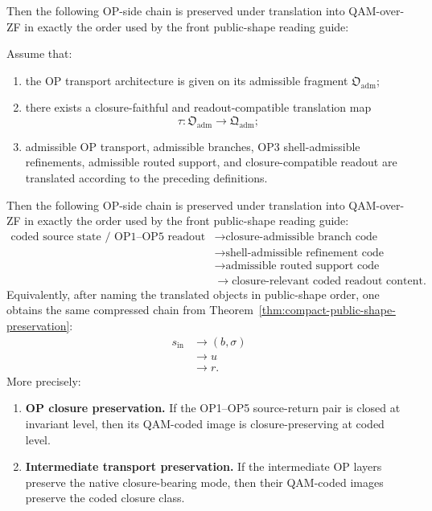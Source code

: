 Then the following OP-side chain is preserved under translation into QAM-over-ZF in exactly the order used by the front public-shape reading guide:
\begin{theorem}\label{thm:qam-translation}
Assume that:
\begin{enumerate}
\item the OP transport architecture is given on its admissible fragment $\mathfrak{O}_{\mathrm{adm}}$;
\item there exists a closure-faithful and readout-compatible translation map
\[
\tau:\mathfrak{O}_{\mathrm{adm}}\to \mathfrak{Q}_{\mathrm{adm}};
\]
\item admissible OP transport, admissible branches, OP3 shell-admissible refinements, admissible routed support, and closure-compatible readout are translated according to the preceding definitions.
\end{enumerate}
Then the following OP-side chain is preserved under translation into QAM-over-ZF in exactly the order used by the front public-shape reading guide:
\[
\begin{aligned}
\text{coded source state / OP1--OP5 readout face}
&\longrightarrow \text{closure-admissible branch code}\\
&\longrightarrow \text{shell-admissible refinement code}\\
&\longrightarrow \text{admissible routed support code}\\
&\longrightarrow \text{closure-relevant coded readout content}.
\end{aligned}
\]
Equivalently, after naming the translated objects in public-shape order, one obtains the same compressed chain from Theorem~\ref{thm:compact-public-shape-preservation}:
\[
\begin{aligned}
s_{\mathrm{in}}
&\longrightarrow (b,\sigma)\\
&\longrightarrow u\\
&\longrightarrow r.
\end{aligned}
\]
More precisely:

\begin{enumerate}
\item \textbf{OP closure preservation.} 
If the OP1--OP5 source-return pair is closed at invariant level, then its QAM-coded image is closure-preserving at coded level.

\item \textbf{Intermediate transport preservation.} 
If the intermediate OP layers preserve the native closure-bearing mode, then their QAM-coded images preserve the coded closure class.


\end{enumerate}
\end{theorem}
